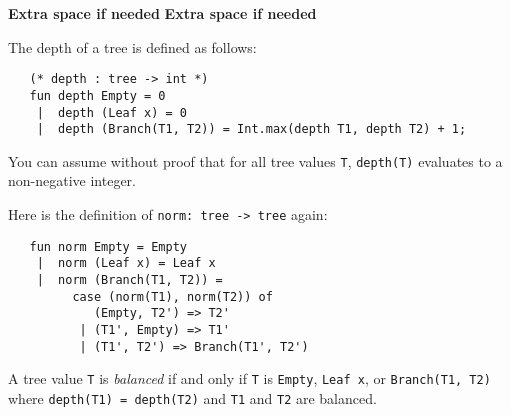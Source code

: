 \documentclass[answers,addpoints,12pt]{exam}
\begin{document}
\begin{questions}
\begin{solution}
\end{solution}

\newpage
\textbf{Extra space if needed}
\newpage
\textbf{Extra space if needed}
\newpage


The depth of a tree is defined as follows:
\begin{verbatim}
   (* depth : tree -> int *)  
   fun depth Empty = 0
    |  depth (Leaf x) = 0
    |  depth (Branch(T1, T2)) = Int.max(depth T1, depth T2) + 1;
\end{verbatim}
You can assume without proof that for all tree values {\tt T}, {\tt depth(T)} evaluates to a non-negative integer.


Here is the definition of {\tt norm: tree -> tree} again:
\begin{verbatim}
   fun norm Empty = Empty
    |  norm (Leaf x) = Leaf x
    |  norm (Branch(T1, T2)) =
         case (norm(T1), norm(T2)) of
            (Empty, T2') => T2'
          | (T1', Empty) => T1'
          | (T1', T2') => Branch(T1', T2')
\end{verbatim}

A tree value {\tt T} is {\it balanced} if and only if  {\tt T} is {\tt Empty}, {\tt Leaf x}, or {\tt Branch(T1, T2)} where {\tt depth(T1) = depth(T2)} and
{\tt T1} and {\tt T2} are balanced.



\end{questions}
\end{document}
